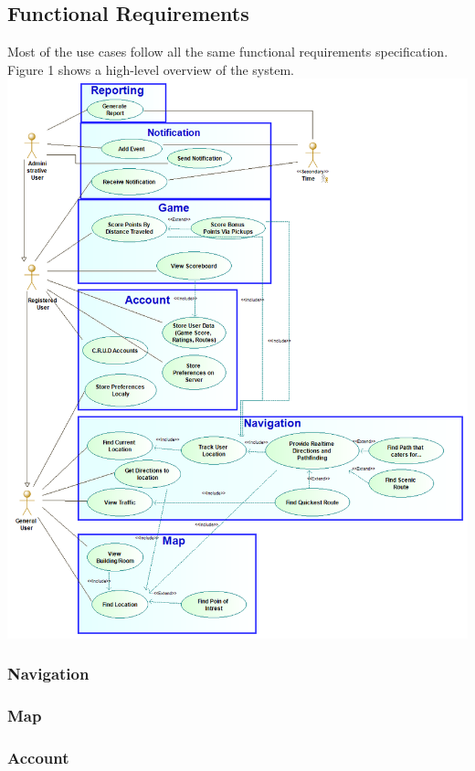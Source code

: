 \documentclass{article}
\begin{document}
    	\subsection{Functional Requirements}
    	
    	Most of the use cases follow all the same functional requirements specification. Figure 1 shows a high-level overview of the system. \\
    	\includegraphics[width=\textwidth]{System_Use_Case_Diagram}
    	
    	\subsubsection{Navigation}
    	
    	\subsubsection{Map}
    	
    	\subsubsection{Account}
    	
\end{document}
